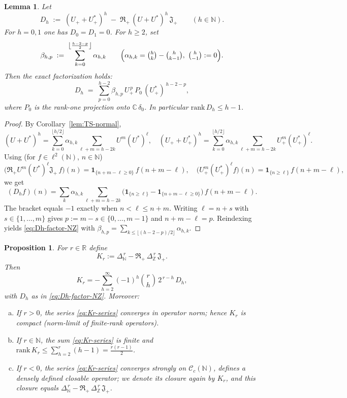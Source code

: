 \documentclass[10pt]{amsart}
\newcommand{\R}{{\mathbb{R}}}
\newcommand{\C}{{\mathbb{C}}}
\newcommand{\Z}{{\mathbb{Z}}}
\newcommand{\N}{{\mathbb{N}}}
\newcommand{\1}{{\mathbb{I}}}
\numberwithin{equation}{section}
\newtheorem{proposition}[theorem]{Proposition}%
\newtheorem{lemma}[theorem]{Lemma}%
\begin{document}
\begin{lemma}\label{lem:boundary-hankel}
Let
\[
D_h\;:=\;(U_+ + U_+^*)^{h}\;-\;\mathfrak{R}_+\,(U+U^*)^{h}\,\mathfrak{J}_+\qquad(h\in\N).
\]
For $h=0,1$ one has $D_0=D_1=0$. For $h\ge 2$, set
\[
\beta_{h,p}\;:=\;\sum_{k=0}^{\left\lfloor\frac{h-2-p}{2}\right\rfloor}\alpha_{h,k}
\qquad\Bigl(\alpha_{h,k}=\tbinom{h}{k}-\tbinom{h}{k-1},\ \tbinom{h}{-1}:=0\Bigr).
\]
Then the exact factorization holds:
\begin{equation}\label{eq:Dh-factor-NZ}
D_h \;=\; \sum_{p=0}^{h-2} \beta_{h,p}\, U_+^{\,p}\, P_0\, (U_+^*)^{\,h-2-p},
\end{equation}
where $P_0$ is the rank-one projection onto $\C\,\delta_0$. In particular $\mathrm{rank}\,D_h\le h-1$.
\end{lemma}

\begin{proof}
By Corollary~\ref{lem:TS-normal},
\[
(U+U^*)^{h}=\sum_{k=0}^{\lfloor h/2\rfloor}\alpha_{h,k}
\!\!\sum_{\ell+m=h-2k}\!\! U^{m}(U^*)^{\ell},
\quad
(U_+ + U_+^*)^{h}=\sum_{k=0}^{\lfloor h/2\rfloor}\alpha_{h,k}
\!\!\sum_{\ell+m=h-2k}\!\! U_+^{m}(U_+^*)^{\ell}.
\]
Using (for $f\in\ell^2(\N)$, $n\in\N$)
\[
\bigl(\mathfrak{R}_+U^{m}(U^*)^{\ell}\mathfrak{J}_+\,f\bigr)(n)=\mathbf{1}_{\{n+m-\ell\ge 0\}}\,f(n+m-\ell),\quad
\bigl(U_+^{m}(U_+^*)^{\ell}f\bigr)(n)=\mathbf{1}_{\{n\ge \ell\}}\,f(n+m-\ell),
\]
we get
\[
(D_h f)(n)=\sum_{k}\alpha_{h,k}\!\!\sum_{\ell+m=h-2k}\!\!
\bigl(\mathbf{1}_{\{n\ge \ell\}}-\mathbf{1}_{\{n+m-\ell\ge 0\}}\bigr)\,f(n+m-\ell).
\]
The bracket equals $-1$ exactly when $n<\ell\le n+m$.
Writing $\ell=n+s$ with $s\in\{1,\dots,m\}$ gives $p:=m-s\in\{0,\dots,m-1\}$ and $n+m-\ell=p$.
Reindexing yields \eqref{eq:Dh-factor-NZ} with $\beta_{h,p}=\sum_{k\le \lfloor (h-2-p)/2\rfloor}\alpha_{h,k}$.
\end{proof}
\begin{proposition}\label{prop:Kr-structure}
For $r\in\R$ define
\[
K_r:=\Delta_{\N}^{\,r}-\mathfrak{R}_+\,\Delta_{\Z}^{\,r}\,\mathfrak{J}_+.
\]
Then
\begin{equation}\label{eq:Kr-series}
K_r=-\sum_{h=2}^{\infty}(-1)^h\binom{r}{h}\,2^{\,r-h}\,D_h,
\end{equation}
with $D_h$ as in \eqref{eq:Dh-factor-NZ}. Moreover:
\begin{enumerate}[(a)]
\item If $r>0$, the series \eqref{eq:Kr-series} converges in operator norm; hence $K_r$ is compact (norm-limit of finite-rank operators).
\item If $r\in\N$, the sum \eqref{eq:Kr-series} is finite and
$\displaystyle \mathrm{rank}\,K_r\le \sum_{h=2}^{r}(h-1)=\frac{r(r-1)}{2}$.
\item If $r<0$, the series \eqref{eq:Kr-series} converges strongly on $\mathcal{C}_c(\N)$,
defines a densely defined closable operator; we denote its closure again by $K_r$,
and this closure equals $\Delta_{\N}^{\,r}-\mathfrak{R}_+\,\Delta_{\Z}^{\,r}\,\mathfrak{J}_+$.
\end{enumerate}
\end{proposition}
\end{document}
